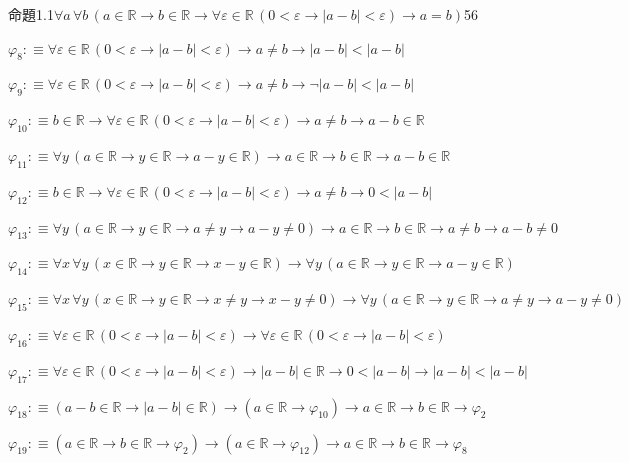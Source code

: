 \begin{fullproof}{命題1.1}{$\forall a\,\forall b\,(a \in \mathbb{R} \to b \in \mathbb{R} \to \forall \varepsilon \in \mathbb{R}\,(0 < \varepsilon \to \lvert a - b \rvert < \varepsilon) \to a = b)$}{56}
\begin{abbrevlist}
\item $\varphi_{8} :\equiv \forall \varepsilon \in \mathbb{R}\,(0 < \varepsilon \to \lvert a - b \rvert < \varepsilon) \to a \neq b \to \lvert a - b \rvert < \lvert a - b \rvert$
\item $\varphi_{9} :\equiv \forall \varepsilon \in \mathbb{R}\,(0 < \varepsilon \to \lvert a - b \rvert < \varepsilon) \to a \neq b \to \neg \lvert a - b \rvert < \lvert a - b \rvert$
\item $\varphi_{10} :\equiv b \in \mathbb{R} \to \forall \varepsilon \in \mathbb{R}\,(0 < \varepsilon \to \lvert a - b \rvert < \varepsilon) \to a \neq b \to a - b \in \mathbb{R}$
\item $\varphi_{11} :\equiv \forall y\,(a \in \mathbb{R} \to y \in \mathbb{R} \to a - y \in \mathbb{R}) \to a \in \mathbb{R} \to b \in \mathbb{R} \to a - b \in \mathbb{R}$
\item $\varphi_{12} :\equiv b \in \mathbb{R} \to \forall \varepsilon \in \mathbb{R}\,(0 < \varepsilon \to \lvert a - b \rvert < \varepsilon) \to a \neq b \to 0 < \lvert a - b \rvert$
\item $\varphi_{13} :\equiv \forall y\,(a \in \mathbb{R} \to y \in \mathbb{R} \to a \neq y \to a - y \neq 0) \to a \in \mathbb{R} \to b \in \mathbb{R} \to a \neq b \to a - b \neq 0$
\item $\varphi_{14} :\equiv \forall x\,\forall y\,(x \in \mathbb{R} \to y \in \mathbb{R} \to x - y \in \mathbb{R}) \to \forall y\,(a \in \mathbb{R} \to y \in \mathbb{R} \to a - y \in \mathbb{R})$
\item $\varphi_{15} :\equiv \forall x\,\forall y\,(x \in \mathbb{R} \to y \in \mathbb{R} \to x \neq y \to x - y \neq 0) \to \forall y\,(a \in \mathbb{R} \to y \in \mathbb{R} \to a \neq y \to a - y \neq 0)$
\item $\varphi_{16} :\equiv \forall \varepsilon \in \mathbb{R}\,(0 < \varepsilon \to \lvert a - b \rvert < \varepsilon) \to \forall \varepsilon \in \mathbb{R}\,(0 < \varepsilon \to \lvert a - b \rvert < \varepsilon)$
\item $\varphi_{17} :\equiv \forall \varepsilon \in \mathbb{R}\,(0 < \varepsilon \to \lvert a - b \rvert < \varepsilon) \to \lvert a - b \rvert \in \mathbb{R} \to 0 < \lvert a - b \rvert \to \lvert a - b \rvert < \lvert a - b \rvert$
\item $\varphi_{18} :\equiv (a - b \in \mathbb{R} \to \lvert a - b \rvert \in \mathbb{R}) \to (a \in \mathbb{R} \to \varphi_{10}) \to a \in \mathbb{R} \to b \in \mathbb{R} \to \varphi_{2}$
\item $\varphi_{19} :\equiv (a \in \mathbb{R} \to b \in \mathbb{R} \to \varphi_{2}) \to (a \in \mathbb{R} \to \varphi_{12}) \to a \in \mathbb{R} \to b \in \mathbb{R} \to \varphi_{8}$

\end{abbrevlist}
\end{fullproof}
